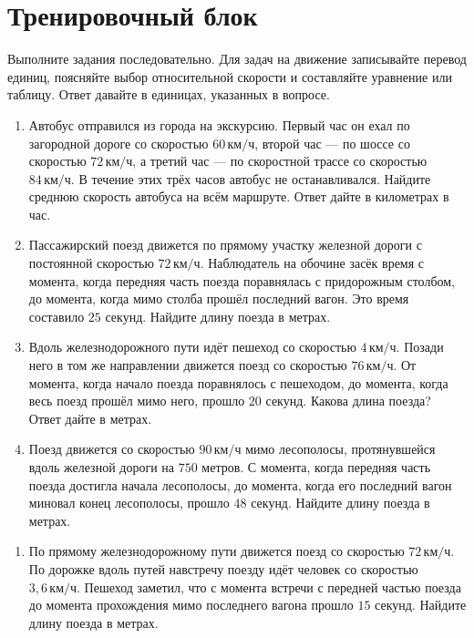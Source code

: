 \documentclass[a4paper,12pt]{article}
\newcommand{\topic}[1]{\par\medskip\noindent{\color{darkaccent}\textbf{#1}}\par\smallskip}
\newcommand{\unit}[1]{\,\text{#1}}
\begin{document}
\section*{Тренировочный блок}
Выполните задания последовательно. Для задач на движение записывайте перевод единиц, поясняйте выбор относительной скорости и составляйте уравнение или таблицу. Ответ давайте в единицах, указанных в вопросе.
\topic{Средний уровень}
\begin{enumerate}
\item Автобус отправился из города на экскурсию. Первый час он ехал по загородной дороге со скоростью $60\unit{км/ч}$, второй час --- по шоссе со скоростью $72\unit{км/ч}$, а третий час --- по скоростной трассе со скоростью $84\unit{км/ч}$. В течение этих трёх часов автобус не останавливался. Найдите среднюю скорость автобуса на всём маршруте. Ответ дайте в километрах в час.
\item Пассажирский поезд движется по прямому участку железной дороги с постоянной скоростью $72\unit{км/ч}$. Наблюдатель на обочине засёк время с момента, когда передняя часть поезда поравнялась с придорожным столбом, до момента, когда мимо столба прошёл последний вагон. Это время составило $25$ секунд. Найдите длину поезда в метрах.
\item Вдоль железнодорожного пути идёт пешеход со скоростью $4\unit{км/ч}$. Позади него в том же направлении движется поезд со скоростью $76\unit{км/ч}$. От момента, когда начало поезда поравнялось с пешеходом, до момента, когда весь поезд прошёл мимо него, прошло $20$ секунд. Какова длина поезда? Ответ дайте в метрах.
\item Поезд движется со скоростью $90\unit{км/ч}$ мимо лесополосы, протянувшейся вдоль железной дороги на $750$ метров. С момента, когда передняя часть поезда достигла начала лесополосы, до момента, когда его последний вагон миновал конец лесополосы, прошло $48$ секунд. Найдите длину поезда в метрах.
\end{enumerate}
\topic{Уровень выше среднего}
\begin{enumerate}[resume]
\item По прямому железнодорожному пути движется поезд со скоростью $72\unit{км/ч}$. По дорожке вдоль путей навстречу поезду идёт человек со скоростью $3,6\unit{км/ч}$. Пешеход заметил, что с момента встречи с передней частью поезда до момента прохождения мимо последнего вагона прошло $15$ секунд. Найдите длину поезда в метрах.
\end{enumerate}

\clearpage
\end{document}
